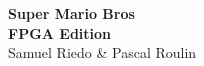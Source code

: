\documentclass[french]{article}
\begin{document}

\begingroup
\thispagestyle{empty}
\centering
\vspace*{5.4cm}
{ \Huge \bfseries Super Mario Bros \\[1cm] }
{ \Huge \bfseries FPGA Edition \\[1.5cm] }
{\huge Samuel Riedo \& Pascal Roulin}\par %
\endgroup


\newpage
\tableofcontents
\newpage

\end{document}
